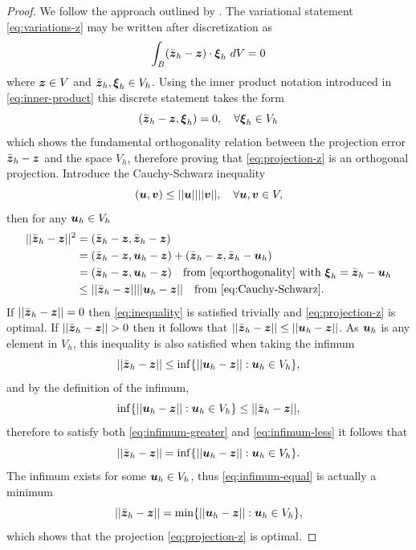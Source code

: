 \documentclass[12pt]{article}
\newcommand{\mbs}[1]{\boldsymbol{#1}}
\def\bv{{\mbs{v}}} \def\bw{{\mbs{w}}} \def\bx{{\mbs{x}}}
\def\bxi{{\mbs{\xi}}}
\begin{document}
\begin{proof}
We follow the approach outlined by \citet{Brenner.Scott:2002}. The
variational statement \eqref{eq:variations-z} may be written after
discretization as
\begin{equation}
  \int_B (\bar{\bz}_h - \bz) \cdot \bxi_h \ dV = 0
  \label{eq:variations-z-discrete}
\end{equation}
where $\bz \in V$ and $\bar{\bz}_h, \bxi_h \in V_h$. Using
the inner product notation introduced in \eqref{eq:inner-product} this
discrete statement takes the form
\begin{equation}
  (\bar{\bz}_h - \bz, \bxi_h) = 0, \quad \forall \bxi_h \in V_h
  \label{eq:orthogonality}
\end{equation}
which shows the fundamental orthogonality relation between the
projection error $\bar{\bz}_h - \bz$ and the space $V_h$,
therefore proving that \eqref{eq:projection-z} is an orthogonal
projection. Introduce the Cauchy-Schwarz inequality
\begin{equation}
  (\bu, \bv) \le ||\bu|| ||\bv||, \quad \forall \bu, \bv \in V,
  \label{eq:Cauchy-Schwarz}
\end{equation}
then for any $\bu_h \in V_h$
\begin{align}
  ||\bar{\bz}_h - \bz||^2 & = (\bar{\bz}_h - \bz, \bar{\bz}_h - \bz)
  \\
  & = (\bar{\bz}_h - \bz, \bu_h - \bz) +
  (\bar{\bz}_h - \bz, \bar{\bz}_h - \bu_h)
  \\
  & = (\bar{\bz}_h - \bz, \bu_h - \bz) \quad
  \text{from \eqref{eq:orthogonality} with
    $\bxi_h = \bar{\bz}_h - \bu_h$}
  \\
  & \le ||\bar{\bz}_h - \bz|| ||\bu_h - \bz|| \quad
  \text{from \eqref{eq:Cauchy-Schwarz}}.
  \label{eq:inequality}
\end{align}
If $||\bar{\bz}_h - \bz|| = 0$ then \eqref{eq:inequality} is satisfied
trivially and \eqref{eq:projection-z} is optimal. If $||\bar{\bz}_h -
\bz|| > 0$ then it follows that $||\bar{\bz}_h - \bz|| \le ||\bu_h -
\bz||$. As $\bu_h$ is any element in $V_h$, this
inequality is also satisfied when taking the infimum
\begin{equation}
  ||\bar{\bz}_h - \bz||
  \le
  \inf\{||\bu_h - \bz|| : \bu_h \in V_h \},
  \label{eq:infimum-greater}
\end{equation}
and by the definition of the infimum,
\begin{equation}
  \inf\{||\bu_h - \bz|| : \bu_h \in V_h \}
  \le
  ||\bar{\bz}_h - \bz||,
  \label{eq:infimum-less}
\end{equation}
therefore to satisfy both \eqref{eq:infimum-greater} and
\eqref{eq:infimum-less} it follows that
\begin{equation}
  ||\bar{\bz}_h - \bz||
  =
  \inf\{||\bu_h - \bz|| : \bu_h \in V_h \}.
  \label{eq:infimum-equal}
\end{equation}
The infimum exists for some $\bu_h \in V_h$, thus
\eqref{eq:infimum-equal} is actually a minimum
\begin{equation}
  ||\bar{\bz}_h - \bz||
  =
  \min\{||\bu_h - \bz|| : \bu_h \in V_h \},
  \label{eq:minimum-equal}
\end{equation}
which shows that the projection \eqref{eq:projection-z} is optimal.
\end{proof}
\end{document}
